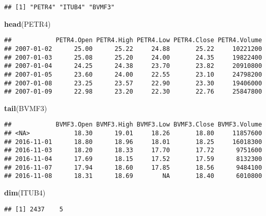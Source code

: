 \documentclass[]{article}
\newenvironment{Shaded}{\begin{snugshade}}{\end{snugshade}}
\newcommand{\KeywordTok}[1]{\textcolor[rgb]{0.13,0.29,0.53}{\textbf{{#1}}}}
\newcommand{\NormalTok}[1]{{#1}}
\begin{document}
\begin{verbatim}
## [1] "PETR4" "ITUB4" "BVMF3"
\end{verbatim}

\begin{Shaded}
\begin{Highlighting}[]
\KeywordTok{head}\NormalTok{(PETR4)}
\end{Highlighting}
\end{Shaded}

\begin{verbatim}
##            PETR4.Open PETR4.High PETR4.Low PETR4.Close PETR4.Volume
## 2007-01-02      25.00      25.22     24.88       25.22     10221200
## 2007-01-03      25.08      25.20     24.00       24.35     19822400
## 2007-01-04      24.25      24.38     23.70       23.82     20910800
## 2007-01-05      23.60      24.00     22.55       23.10     24798200
## 2007-01-08      23.25      23.57     22.90       23.30     19406000
## 2007-01-09      22.98      23.20     22.30       22.76     25847800
\end{verbatim}

\begin{Shaded}
\begin{Highlighting}[]
\KeywordTok{tail}\NormalTok{(BVMF3)}
\end{Highlighting}
\end{Shaded}

\begin{verbatim}
##            BVMF3.Open BVMF3.High BVMF3.Low BVMF3.Close BVMF3.Volume
## <NA>            18.30      19.01     18.26       18.80     11857600
## 2016-11-01      18.80      18.96     18.01       18.25     16018300
## 2016-11-03      18.20      18.33     17.70       17.72      9751600
## 2016-11-04      17.69      18.15     17.52       17.59      8132300
## 2016-11-07      17.94      18.60     17.85       18.56      9484100
## 2016-11-08      18.31      18.69        NA       18.40      6010800
\end{verbatim}

\begin{Shaded}
\begin{Highlighting}[]
\KeywordTok{dim}\NormalTok{(ITUB4)}
\end{Highlighting}
\end{Shaded}

\begin{verbatim}
## [1] 2437    5
\end{verbatim}
\end{document}
